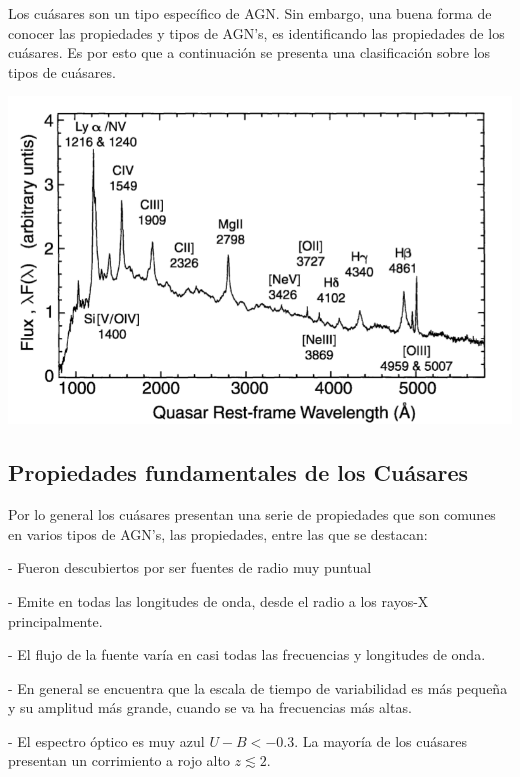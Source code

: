 Los cuásares son un tipo específico de AGN. Sin embargo, una buena forma de conocer las propiedades y tipos de  AGN's, es identificando las propiedades de los cuásares. Es por esto que a continuación se presenta una clasificación sobre los tipos de cuásares.  


\includegraphics[scale=.3]{./figures/3_AGNs/Espectro_tipico_AGN.png}
\label{fig:Espectro_QSOs}

	\subsection{Propiedades fundamentales de los Cuásares}
	\label{subsec:Fundamental_properties_quasars}

Por lo general los cuásares presentan una serie de propiedades que son comunes en varios tipos de AGN's, las propiedades, entre las que se destacan:


- Fueron descubiertos por ser fuentes de radio muy puntual 

- Emite en todas las longitudes de onda, desde el radio a los rayos-X principalmente.

- El flujo de la fuente varía en casi todas las frecuencias y longitudes de onda.

- En general se encuentra que la escala de tiempo de variabilidad es más pequeña y su amplitud más grande, cuando se va ha frecuencias más altas.

- El espectro óptico es muy azul $U-B < -0.3$. La mayoría de los cuásares presentan un corrimiento a rojo alto  $z \lesssim 2$.

